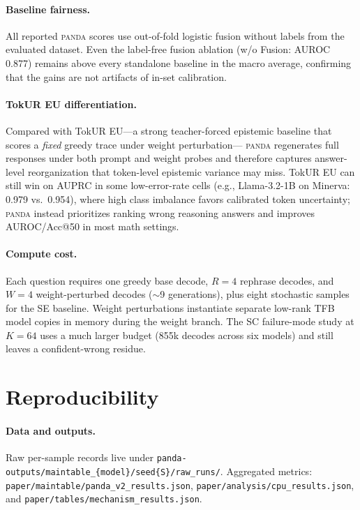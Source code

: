 \documentclass{article} %
\DeclareRobustCommand{\method}{%
  \texorpdfstring{%
    \ifmmode\text{\normalfont\textsc{panda}}\else\textsc{panda}\xspace\fi
  }{PANDA}%
}
\begin{document}
\paragraph{Baseline fairness.}
All reported \method{} scores use out-of-fold logistic fusion without labels from the evaluated dataset.
Even the label-free fusion ablation (w/o Fusion: AUROC 0.877) remains above every standalone baseline in the macro average, confirming that the gains are not artifacts of in-set calibration.

\paragraph{TokUR EU differentiation.}
Compared with TokUR EU---a strong teacher-forced epistemic baseline that scores a \emph{fixed} greedy trace under weight perturbation---\method{} regenerates full responses under both prompt and weight probes and therefore captures answer-level reorganization that token-level epistemic variance may miss.
TokUR EU can still win on AUPRC in some low-error-rate cells (e.g., Llama-3.2-1B on Minerva: 0.979 vs.\ 0.954), where high class imbalance favors calibrated token uncertainty; \method{} instead prioritizes ranking wrong reasoning answers and improves AUROC/Acc@50 in most math settings.

\paragraph{Compute cost.}
Each question requires one greedy base decode, $R{=}4$ rephrase decodes, and $W{=}4$ weight-perturbed decodes ($\sim$9 generations), plus eight stochastic samples for the SE baseline.
Weight perturbations instantiate separate low-rank TFB model copies in memory during the weight branch.
The SC failure-mode study at $K{=}64$ uses a much larger budget (855k decodes across six models) and still leaves a confident-wrong residue.


\section{Reproducibility}
\label{app:repro}

\paragraph{Data and outputs.}
Raw per-sample records live under \texttt{panda-outputs/maintable\_\{model\}/seed\{S\}/raw\_runs/}.
Aggregated metrics: \texttt{paper/maintable/panda\_v2\_results.json}, \texttt{paper/analysis/cpu\_results.json}, and \texttt{paper/tables/mechanism\_results.json}.
\end{document}
